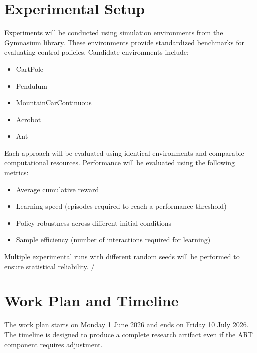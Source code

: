 \documentclass[12pt]{article}
\begin{document}
\section{Experimental Setup}

Experiments will be conducted using simulation environments from the Gymnasium library. These environments provide standardized benchmarks for evaluating control policies. Candidate environments include:

\begin{itemize}
\item CartPole
\item Pendulum
\item MountainCarContinuous
\item Acrobot
\item Ant
\end{itemize}

Each approach will be evaluated using identical environments and comparable computational resources. Performance will be evaluated using the following metrics:

\begin{itemize}
\item Average cumulative reward
\item Learning speed (episodes required to reach a performance threshold)
\item Policy robustness across different initial conditions
\item Sample efficiency (number of interactions required for learning)
\end{itemize}

Multiple experimental runs with different random seeds will be performed to ensure statistical reliability.
/
\section{Work Plan and Timeline}

The work plan starts on Monday 1 June 2026 and ends on Friday 10 July 2026. The timeline is designed to produce a complete research artifact even if the ART component requires adjustment.
\end{document}
